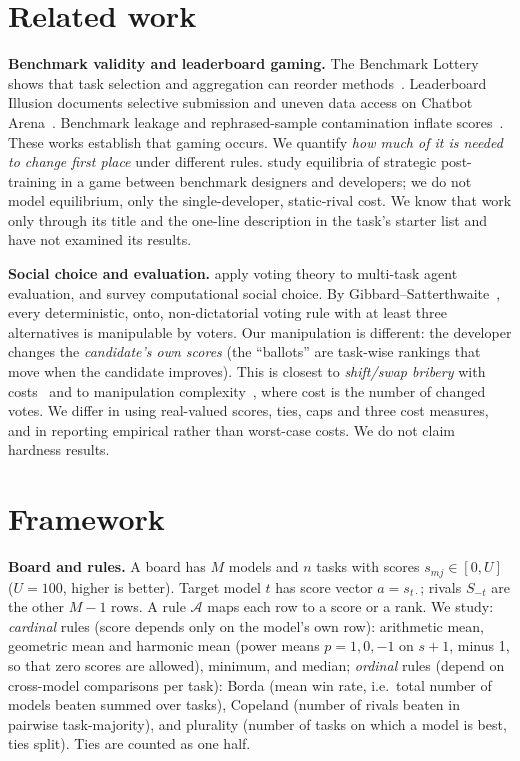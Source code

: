 \documentclass{article}
\theoremstyle{remark}
\begin{document}
\section{Related work}
\textbf{Benchmark validity and leaderboard gaming.} The Benchmark Lottery shows that task selection and aggregation can reorder methods~\citep{dehghani2021lottery}. Leaderboard Illusion documents selective submission and uneven data access on Chatbot Arena~\citep{singh2025illusion}. Benchmark leakage and rephrased-sample contamination inflate scores~\citep{zhou2023cheater,yang2023rephrased}. These works establish that gaming occurs. We quantify \emph{how much of it is needed to change first place} under different rules. \citet{chen2026incentives} study equilibria of strategic post-training in a game between benchmark designers and developers; we do not model equilibrium, only the single-developer, static-rival cost. We know that work only through its title and the one-line description in the task's starter list and have not examined its results.

\textbf{Social choice and evaluation.} \citet{lanctot2023social} apply voting theory to multi-task agent evaluation, and \citet{brandt2016handbook} survey computational social choice. By Gibbard--Satterthwaite~\citep{gibbard1973manipulation,satterthwaite1975strategy}, every deterministic, onto, non-dictatorial voting rule with at least three alternatives is manipulable by voters. Our manipulation is different: the developer changes the \emph{candidate's own scores} (the ``ballots'' are task-wise rankings that move when the candidate improves). This is closest to \emph{shift/swap bribery} with costs~\citep{faliszewski2009bribery,elkind2009swap} and to manipulation complexity~\citep{bartholdi1989computational}, where cost is the number of changed votes. We differ in using real-valued scores, ties, caps and three cost measures, and in reporting empirical rather than worst-case costs. We do not claim hardness results.

\section{Framework}\label{sec:framework}
\textbf{Board and rules.} A board has $M$ models and $n$ tasks with scores $s_{mj}\in[0,U]$ ($U=100$, higher is better). Target model $t$ has score vector $a=s_{t\cdot}$; rivals $S_{-t}$ are the other $M-1$ rows. A rule $\mathcal A$ maps each row to a score or a rank. We study:
\emph{cardinal} rules (score depends only on the model's own row): arithmetic mean, geometric mean and harmonic mean (power means $p=1,0,-1$ on $s+1$, minus 1, so that zero scores are allowed), minimum, and median;
\emph{ordinal} rules (depend on cross-model comparisons per task): Borda (mean win rate, i.e.\ total number of models beaten summed over tasks), Copeland (number of rivals beaten in pairwise task-majority), and plurality (number of tasks on which a model is best, ties split). Ties are counted as one half.
\end{document}
